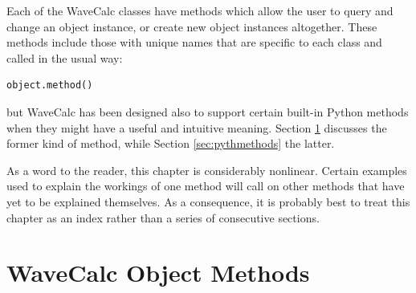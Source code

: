 \documentclass[11pt, reqno]{book}%
\newcounter{ct}
\begin{document}
Each of the WaveCalc classes have methods which allow the user to query and change an object instance, or create new object instances altogether. These methods include those with unique names that are specific to each class and called in the usual way:
\begin{verbatim}
object.method()
\end{verbatim}
\noindent but WaveCalc has been designed also to support certain built-in Python methods when they might have a useful and intuitive meaning. Section \ref{sec:objmethods} discusses the former kind of method, while Section \ref{sec:pythmethods} the latter.

As a word to the reader, this chapter is considerably nonlinear. Certain examples used to explain the workings of one method will call on other methods that have yet to be explained themselves. As a consequence, it is probably best to treat this chapter as an index rather than a series of consecutive sections.
















\section{WaveCalc Object Methods}
\label{sec:objmethods}
\end{document}
